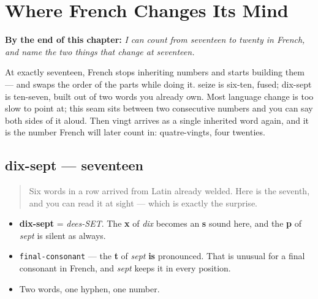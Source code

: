 
\chapter{Where French Changes Its Mind}
\label{ch:numbers-17-20}

\begin{chapteropening}
\textbf{By the end of this chapter:} \emph{I can count from seventeen to twenty in French, and name the two things that change at seventeen.}

At exactly seventeen, French stops inheriting numbers and starts building them — and swaps the order of the parts while doing it. seize is six-ten, fused; dix-sept is ten-seven, built out of two words you already own. Most language change is too slow to point at; this seam sits between two consecutive numbers and you can say both sides of it aloud. Then vingt arrives as a single inherited word again, and it is the number French will later count in: quatre-vingts, four twenties.
\end{chapteropening}

\section[dix-sept]{dix-sept — seventeen}

\label{lesson:FR-C12-dix-sept}



\begin{quote}
Six words in a row arrived from Latin already welded. Here is the seventh, and you can read it at sight — which is exactly the surprise.
\end{quote}

\begin{sounds}
\begin{itemize}
\raggedright
  \item \textbf{dix-sept} = \emph{dees-SET}. The \textbf{x} of \emph{dix} becomes an \textbf{s} sound here, and the \textbf{p} of \emph{sept} is silent as always.
  \item \texttt{final-consonant} — the \textbf{t} of \emph{sept} \textbf{is} pronounced. That is unusual for a final consonant in French, and \emph{sept} keeps it in every position.
  \item Two words, one hyphen, one number.
\end{itemize}
\end{sounds}

